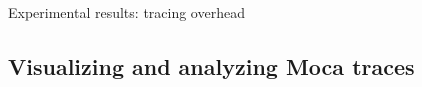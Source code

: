 \documentclass[xcolor={usenames,dvipsnames},hyperref={pdfusetitle}]{beamer}
\begin{document}
\begin{frame}{Experimental results: tracing overhead}
    \pause
\end{frame}

\subsection{Visualizing and analyzing Moca traces}
\end{document}
